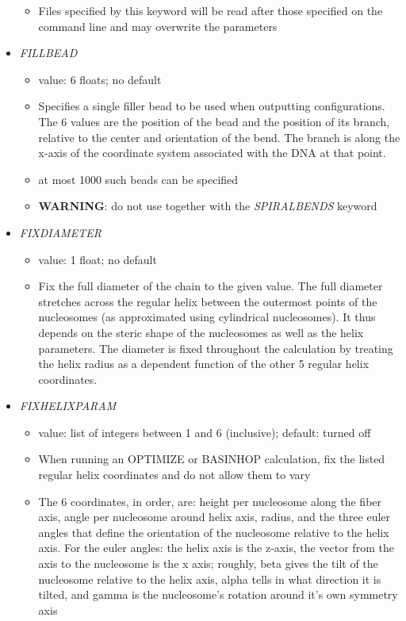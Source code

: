 \documentclass[12pt,dvips]{article}
\begin{document}
\begin{itemize}
\begin{itemize}
  \item Files specified by this keyword will be read after those specified on the command line and may overwrite the parameters
  \end{itemize}
%
\item {\it FILLBEAD}
  \begin{itemize}
    \item value: 6 floats; no default
    \item Specifies a single filler bead to be used when outputting configurations. The 6 values are the position of the bead and the position of its branch, relative to the center and orientation of the bend. The branch is along the x-axis of the coordinate system associated with the DNA at that point.
    \item at most 1000 such beads can be specified
    \item {\bf WARNING}:  do not use together with the {\it SPIRALBENDS} keyword
  \end{itemize}
%
\item {\it FIXDIAMETER}
  \begin{itemize}
    \item value: 1 float; no default
    \item Fix the full diameter of the chain to the given value. The full diameter stretches across the regular helix between the outermost points of the nucleosomes (as approximated using cylindrical nucleosomes). It thus depends on the steric shape of the nucleosomes as well as the helix parameters. The diameter is fixed throughout the calculation by treating the helix radius as a dependent function of the other 5 regular helix coordinates.
  \end{itemize}
%
\item {\it FIXHELIXPARAM}
  \begin{itemize}
    \item value: list of integers between 1 and 6 (inclusive); default: turned off
    \item When running an OPTIMIZE or BASINHOP calculation, fix the listed regular helix coordinates and do not allow them to vary
    \item The 6 coordinates, in order, are: height per nucleosome along the fiber axis, angle per nucleosome around helix axis, radius, and the three euler angles that define the orientation of the nucleosome relative to the helix axis. For the euler angles: the helix axis is the z-axis, the vector from the axis to the nucleosome is the x axis; roughly, beta gives the tilt of the nucleosome relative to the helix axis, alpha tells in what direction it is tilted, and gamma is the nucleosome's rotation around it's own symmetry axis

\end{itemize}
\end{itemize}
\end{document}
